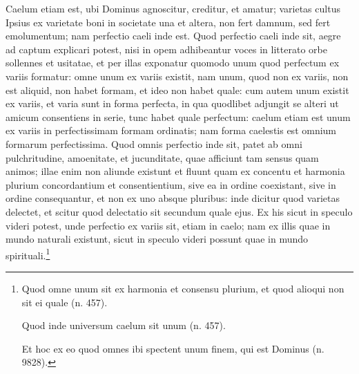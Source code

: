 \begin{topic}{56}
    Caelum etiam est, ubi Dominus agnoscitur, creditur, et amatur; varietas cultus Ipsius ex varietate boni in societate
    una et altera, non fert damnum, sed fert emolumentum; nam perfectio caeli inde est.
    Quod perfectio caeli inde sit, aegre ad captum explicari potest, nisi in opem adhibeantur voces in litterato orbe
    sollennes et usitatae, et per illas exponatur quomodo unum quod perfectum ex variis formatur: omne unum ex variis
    existit, nam unum, quod non ex variis, non est aliquid, non habet formam, et ideo non habet quale: cum autem unum
    existit ex variis, et varia sunt in forma perfecta, in qua quodlibet adjungit se alteri ut amicum consentiens in
    serie, tunc habet quale perfectum: caelum etiam est unum ex variis in perfectissimam formam ordinatis; nam forma
    caelestis est omnium formarum perfectissima.
    Quod omnis perfectio inde sit, patet ab omni pulchritudine, amoenitate, et jucunditate, quae afficiunt tam sensus
    quam animos; illae enim non aliunde existunt et fluunt quam ex concentu et harmonia plurium concordantium et
    consentientium, sive ea in ordine coexistant, sive in ordine consequantur, et non ex uno absque pluribus: inde
    dicitur quod varietas delectet, et scitur quod delectatio sit secundum quale ejus.
    Ex his sicut in speculo videri potest, unde perfectio ex variis sit, etiam in caelo; nam ex illis quae in mundo
    naturali existunt, sicut in speculo videri possunt quae in mundo spirituali.\footnote{Quod omne unum sit ex harmonia
    et consensu plurium, et quod alioqui non sit ei quale (n. 457).

Quod inde universum caelum sit unum (n. 457).

Et hoc ex eo quod omnes ibi spectent unum finem, qui est Dominus (n. 9828).}
\end{topic}

